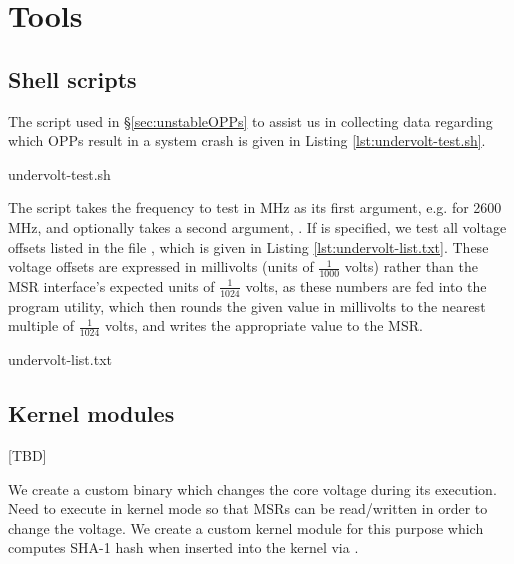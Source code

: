 \section{Tools}
\label{sec:tools}

\subsection{Shell scripts}
\label{sec:undervolt-test.sh}

The script used in §\ref{sec:unstableOPPs} to assist us in collecting data
regarding which OPPs result in a system crash is given in Listing
\ref{lst:undervolt-test.sh}.


    {undervolt-test.sh}

The script takes the frequency to test in MHz as its first argument, e.g.
 for 2600 MHz, and optionally takes a second argument, .
If  is specified, we test all voltage offsets listed in the file
, which is given in Listing \ref{lst:undervolt-list.txt}.
These voltage offsets are expressed in millivolts (units of $\frac{1}{1000}$
volts) rather than the MSR interface's expected units of $\frac{1}{1024}$ volts,
as these numbers are fed into the  program utility, which then
rounds the given value in millivolts to the nearest multiple of $\frac{1}{1024}$
volts, and writes the appropriate value to the MSR.


    {undervolt-list.txt}

\subsection{Kernel modules}

[TBD]

We create a custom  binary which changes the core voltage during its
execution.
Need to execute in kernel mode so that MSRs can be read/written in order to
change the voltage.
We create a custom kernel module for this purpose which computes SHA-1 hash
when inserted into the kernel via .
